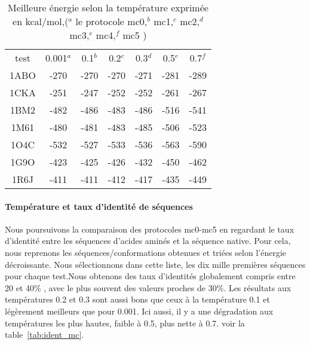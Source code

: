     \begin{table}[!htbp]
      \centering

      \begin{tabular}{ccccccc}
     
        \toprule
         test & 0.001$^a$ & 0.1$^b$ & 0.2$^c$  & 0.3$^d$ & 0.5$^e$ & 0.7$^f$  \\
        \cmidrule{1-7}
        1ABO & -270 & -270 & -270 & -271 & -281  & -289 \\      
        1CKA & -251 & -247 & -252 & -252 & -261  & -267 \\  
        1BM2 & -482 & -486 & -483 & -486 & -516  & -541 \\  
        1M61 & -480 & -481 & -483 & -485 & -506  & -523 \\  
        1O4C & -532 & -527 & -533 & -536 & -563  & -590 \\  
        1G9O & -423 & -425 & -426 & -432 & -450  & -462 \\  
        1R6J & -411 & -411 & -412 & -417 & -435  & -449 \\  

        \bottomrule        
      \end{tabular}
      

      \caption{Meilleure énergie selon la température exprimée en kcal/mol,($^a$ le protocole mc0,$^b$ mc1,$^c$  mc2,$^d$ mc3,$^e$ mc4,$^f$ mc5 )}    
      \label{tab:ener_mc}
    \end{table}
 
   \paragraph{Température et taux d'identité de séquences} 
\label{sec:T_et_I}
Nous poursuivons la comparaison des protocoles mc0-mc5 en regardant le taux d'identité entre les séquences d'acides aminés et la séquence native. Pour cela, nous reprenons les séquences/conformations obtenues et triées selon l'énergie décroissante. Nous sélectionnons dans cette liste, les dix mille premières séquences pour chaque test.Nous obtenons des taux d'identités globalement compris entre 20 et 40\% , avec le plus souvent des valeurs proches de 30\%. Les résultats aux températures 0.2 et 0.3 sont aussi bons que ceux à la température 0.1 et légèrement meilleurs que pour 0.001. Ici aussi, il y a une dégradation aux températures les plus hautes, faible à 0.5, plus nette à 0.7.  voir la table~\ref{tab:ident_mc}.

